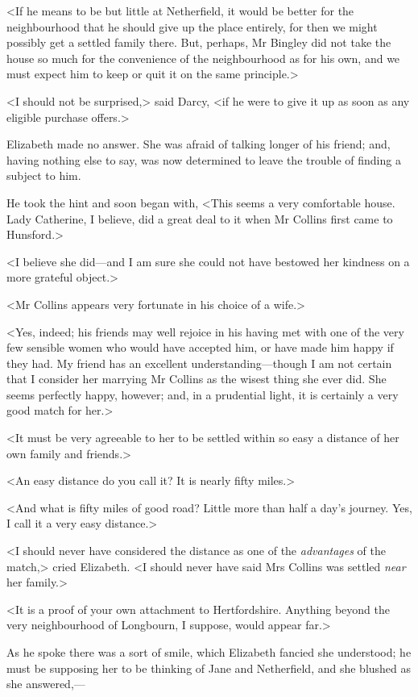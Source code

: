 <If he means to be but little at Netherfield, it would be better for the neighbourhood that he should give up the place entirely, for then we might possibly get a settled family there. But, perhaps, Mr Bingley did not take the house so much for the convenience of the neighbourhood as for his own, and we must expect him to keep or quit it on the same principle.>

<I should not be surprised,> said Darcy, <if he were to give it up as soon as any eligible purchase offers.>

Elizabeth made no answer. She was afraid of talking longer of his friend; and, having nothing else to say, was now determined to leave the trouble of finding a subject to him.

He took the hint and soon began with, <This seems a very comfortable house. Lady Catherine, I believe, did a great deal to it when Mr Collins first came to Hunsford.>

<I believe she did—and I am sure she could not have bestowed her kindness on a more grateful object.>

<Mr Collins appears very fortunate in his choice of a wife.>

<Yes, indeed; his friends may well rejoice in his having met with one of the very few sensible women who would have accepted him, or have made him happy if they had. My friend has an excellent understanding—though I am not certain that I consider her marrying Mr Collins as the wisest thing she ever did. She seems perfectly happy, however; and, in a prudential light, it is certainly a very good match for her.>

<It must be very agreeable to her to be settled within so easy a distance of her own family and friends.>

<An easy distance do you call it? It is nearly fifty miles.>

<And what is fifty miles of good road? Little more than half a day's journey. Yes, I call it a very easy distance.>

<I should never have considered the distance as one of the \textit{advantages} of the match,> cried Elizabeth. <I should never have said Mrs Collins was settled \textit{near} her family.>

<It is a proof of your own attachment to Hertfordshire. Anything beyond the very neighbourhood of Longbourn, I suppose, would appear far.>

As he spoke there was a sort of smile, which Elizabeth fancied she understood; he must be supposing her to be thinking of Jane and Netherfield, and she blushed as she answered,—

